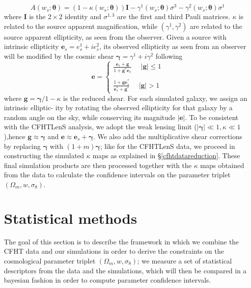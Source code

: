 \documentclass[reprint,aps,prd,superscriptaddress,showkeys,showpacs]{revtex4-1}
\begin{document}
%
\begin{equation}
A(w_s;\pmb{\theta}) = (1-\kappa(w_s;\pmb{\theta}))\pmb{I} - \gamma^1(w_s;\pmb{\theta})\sigma^3 - \gamma^2(w_s;\pmb{\theta})\sigma^1
\end{equation}  
%
where $\pmb{I}$ is the $2\times2$ identity and $\sigma^{1,3}$ are the first and third Pauli matrices. $\kappa$ is related to the source apparent magnification, while $(\gamma^1,\gamma^2)$ are related to the source apparent ellipticity, as seen from the observer. Given a source with intrinsic ellipticity $\mathbf{e}_s=e^1_s + ie^2_s$, its observed ellipticity as seen from an observer will be modified by the cosmic shear $\pmb{\gamma}=\gamma^1 + i\gamma^2$ following
%
\begin{equation}
\mathbf{e} = 
\begin{cases}
\frac{\mathbf{e}_s+\mathbf{g}}{1+\mathbf{g}^*\mathbf{e}_s} \,\,\,\,\,\,\,\, \vert \mathbf{g}\vert \leq 1 \\ \\
\frac{1+\mathbf{ge}_s^*}{\mathbf{e}_s^* + \mathbf{g}^*} \,\,\,\,\,\,\,\, \vert \mathbf{g}\vert > 1
\end{cases}
\end{equation}
%
where $\mathbf{g} = \pmb{\gamma}/1-\kappa$ is the reduced shear. For each simulated galaxy, we assign an intrinsic elliptic- ity by rotating the observed ellipticity for that galaxy by a random angle on the sky, while conserving its magnitude $\vert\mathbf{e}\vert$. To be consistent with the CFHTLenS analysis, we adopt the weak lensing limit ($\vert\pmb{\gamma}\vert\ll1,\kappa\ll1$),hence $\mathbf{g}\approx\pmb{\gamma}$ and $\mathbf{e}\approx \mathbf{e}_s+\pmb{\gamma}$. We also add the multiplicative shear corrections by replacing $\pmb{\gamma}$ with $(1+m)\pmb{\gamma}$; like for the CFHTLenS data, we proceed in constructing the simulated $\kappa$ maps as explained in \S\ref{cfhtdatareduction}. These final simulation products are then processed together with the $\kappa$ maps obtained from the data to calculate the confidence intervals on the parameter triplet $(\Omega_m,w,\sigma_8)$.


\section{Statistical methods}
The goal of this section is to describe the framework in which we combine the CFHT data and our simulations in order to derive the constraints on the cosmological parameter triplet $(\Omega_m,w,\sigma_8)$; we measure a set of statistical descriptors from the data and the simulations, which will then be compared in a bayesian fashion in order to compute parameter confidence intervals.
\end{document}

